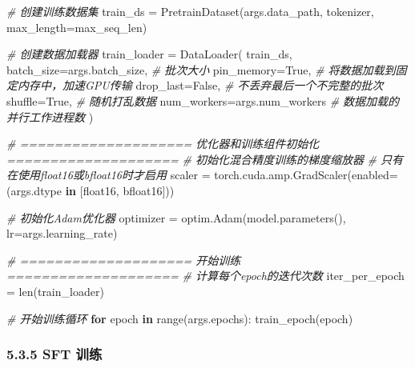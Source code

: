 \documentclass[
]{article}
\newenvironment{Shaded}{}{}
\newcommand{\BuiltInTok}[1]{\textcolor[rgb]{0.00,0.50,0.00}{#1}}
\newcommand{\CommentTok}[1]{\textcolor[rgb]{0.38,0.63,0.69}{\textit{#1}}}
\newcommand{\ControlFlowTok}[1]{\textcolor[rgb]{0.00,0.44,0.13}{\textbf{#1}}}
\newcommand{\KeywordTok}[1]{\textcolor[rgb]{0.00,0.44,0.13}{\textbf{#1}}}
\newcommand{\NormalTok}[1]{#1}
\newcommand{\OperatorTok}[1]{\textcolor[rgb]{0.40,0.40,0.40}{#1}}
\newcommand{\StringTok}[1]{\textcolor[rgb]{0.25,0.44,0.63}{#1}}
\newcommand{\VariableTok}[1]{\textcolor[rgb]{0.10,0.09,0.49}{#1}}
\begin{document}
\begin{Shaded}
\begin{Highlighting}[]
    \CommentTok{\# 创建训练数据集}
\NormalTok{    train\_ds }\OperatorTok{=}\NormalTok{ PretrainDataset(args.data\_path, tokenizer, max\_length}\OperatorTok{=}\NormalTok{max\_seq\_len)}
    
    \CommentTok{\# 创建数据加载器}
\NormalTok{    train\_loader }\OperatorTok{=}\NormalTok{ DataLoader(}
\NormalTok{        train\_ds,}
\NormalTok{        batch\_size}\OperatorTok{=}\NormalTok{args.batch\_size,  }\CommentTok{\# 批次大小}
\NormalTok{        pin\_memory}\OperatorTok{=}\VariableTok{True}\NormalTok{,             }\CommentTok{\# 将数据加载到固定内存中，加速GPU传输}
\NormalTok{        drop\_last}\OperatorTok{=}\VariableTok{False}\NormalTok{,             }\CommentTok{\# 不丢弃最后一个不完整的批次}
\NormalTok{        shuffle}\OperatorTok{=}\VariableTok{True}\NormalTok{,                }\CommentTok{\# 随机打乱数据}
\NormalTok{        num\_workers}\OperatorTok{=}\NormalTok{args.num\_workers }\CommentTok{\# 数据加载的并行工作进程数}
\NormalTok{    )}

    \CommentTok{\# ==================== 优化器和训练组件初始化 ====================}
    \CommentTok{\# 初始化混合精度训练的梯度缩放器}
    \CommentTok{\# 只有在使用float16或bfloat16时才启用}
\NormalTok{    scaler }\OperatorTok{=}\NormalTok{ torch.cuda.amp.GradScaler(enabled}\OperatorTok{=}\NormalTok{(args.dtype }\KeywordTok{in}\NormalTok{ [}\StringTok{\textquotesingle{}float16\textquotesingle{}}\NormalTok{, }\StringTok{\textquotesingle{}bfloat16\textquotesingle{}}\NormalTok{]))}
    
    \CommentTok{\# 初始化Adam优化器}
\NormalTok{    optimizer }\OperatorTok{=}\NormalTok{ optim.Adam(model.parameters(), lr}\OperatorTok{=}\NormalTok{args.learning\_rate)}

    \CommentTok{\# ==================== 开始训练 ====================}
    \CommentTok{\# 计算每个epoch的迭代次数}
\NormalTok{    iter\_per\_epoch }\OperatorTok{=} \BuiltInTok{len}\NormalTok{(train\_loader)}
    
    \CommentTok{\# 开始训练循环}
    \ControlFlowTok{for}\NormalTok{ epoch }\KeywordTok{in} \BuiltInTok{range}\NormalTok{(args.epochs):}
\NormalTok{        train\_epoch(epoch)}
\end{Highlighting}
\end{Shaded}

\subsubsection{5.3.5 SFT 训练}\label{sft-ux8badux7ec3}
\end{document}
